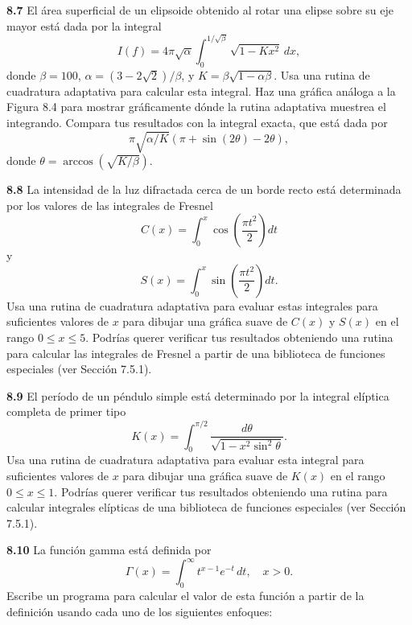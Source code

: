 \documentclass{article}
\begin{document}
\textbf{8.7} El área superficial de un elipsoide obtenido al rotar una elipse sobre su eje mayor está dada por la integral
\[
I(f) = 4\pi\sqrt{\alpha} \int_0^{1/\sqrt{\beta}} \sqrt{1 - Kx^2} \, dx,
\]
donde \(\beta = 100\), \(\alpha = (3 - 2\sqrt{2})/\beta\), y \(K = \beta\sqrt{1 - \alpha\beta}\). Usa una rutina de cuadratura adaptativa para calcular esta integral. Haz una gráfica análoga a la Figura 8.4 para mostrar gráficamente dónde la rutina adaptativa muestrea el integrando. Compara tus resultados con la integral exacta, que está dada por
\[
\pi\sqrt{\alpha/K} \left( \pi + \sin(2\theta) - 2\theta \right),
\]
donde \(\theta = \arccos(\sqrt{K/\beta})\).

\textbf{8.8} La intensidad de la luz difractada cerca de un borde recto está determinada por los valores de las integrales de Fresnel
\[
C(x) = \int_0^x \cos\left(\frac{\pi t^2}{2}\right) dt
\]
y
\[
S(x) = \int_0^x \sin\left(\frac{\pi t^2}{2}\right) dt.
\]
Usa una rutina de cuadratura adaptativa para evaluar estas integrales para suficientes valores de \(x\) para dibujar una gráfica suave de \(C(x)\) y \(S(x)\) en el rango \(0 \leq x \leq 5\). Podrías querer verificar tus resultados obteniendo una rutina para calcular las integrales de Fresnel a partir de una biblioteca de funciones especiales (ver Sección 7.5.1).

\textbf{8.9} El período de un péndulo simple está determinado por la integral elíptica completa de primer tipo
\[
K(x) = \int_0^{\pi/2} \frac{d\theta}{\sqrt{1 - x^2 \sin^2\theta}}.
\]
Usa una rutina de cuadratura adaptativa para evaluar esta integral para suficientes valores de \(x\) para dibujar una gráfica suave de \(K(x)\) en el rango \(0 \leq x \leq 1\). Podrías querer verificar tus resultados obteniendo una rutina para calcular integrales elípticas de una biblioteca de funciones especiales (ver Sección 7.5.1).

\textbf{8.10} La función gamma está definida por
\[
\Gamma(x) = \int_0^\infty t^{x-1} e^{-t} \, dt, \quad x > 0.
\]
Escribe un programa para calcular el valor de esta función a partir de la definición usando cada uno de los siguientes enfoques:
\end{document}
